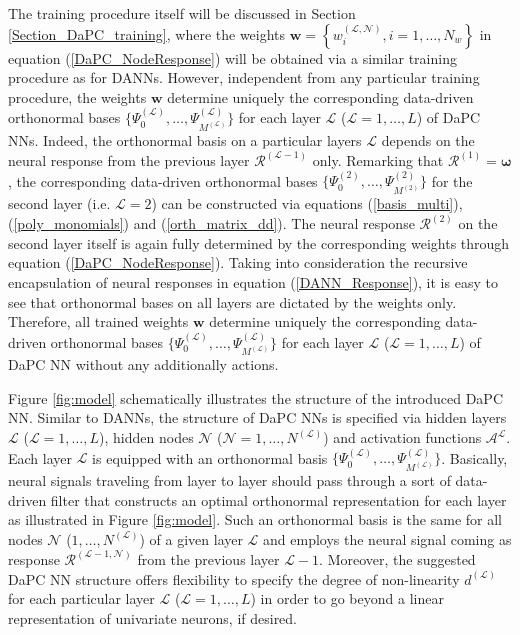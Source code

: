 \documentclass[a4paper,fleqn]{article}
\newcommand{\rw}[1]{\textcolor{blue}{#1}}
\newcommand{\del}[1]{\textcolor{red}{\sout{#1}}}
\renewcommand{\del}[1]{}
\renewcommand{\rw}[1]{#1}
\begin{document}
The training procedure itself will be discussed in Section \ref{Section_DaPC_training}, where the weights $\bm{w}=\left\{w^{(\mathcal{L},\mathcal{N})}_{i},i=1,\ldots,N_w \right\}$ in equation (\ref{DaPC_NodeResponse}) will be obtained via a similar training procedure as for DANNs.  However, independent from any particular training procedure, the weights $\bm{w}$ determine uniquely the corresponding data-driven orthonormal bases $\big\{ \Psi^{(\mathcal{L})}_0,\ldots, \Psi^{(\mathcal{L})}_{M^{(\mathcal{L})}}\big\}$ for each layer $\mathcal{L}$ ($\mathcal{L}=1,\ldots,L$) of DaPC NNs. Indeed, the orthonormal basis on a particular layers $\mathcal{L}$ depends on the neural response from the previous layer $\bm{\mathcal{R}}^{(\mathcal{L}-1)}$ only. Remarking that $\bm{\mathcal{R}}^{(1)} =\bm{\omega}$, the corresponding data-driven orthonormal bases $\big\{ \Psi^{(2)}_0,\ldots, \Psi^{(2)}_{M^{(2)}}\big\}$ for the second layer (i.e. $\mathcal{L}=2$) \del{could} \rw{can} be constructed via equations (\ref{basis_multi}), (\ref{poly_monomials}) and (\ref{orth_matrix_dd}). The neural response  $\bm{\mathcal{R}}^{(2)}$ on the second layer itself is again fully determined by the corresponding weights through equation (\ref{DaPC_NodeResponse}). Taking into consideration the recursive encapsulation of neural responses in equation (\ref{DANN_Response}), it is easy to see that orthonormal bases on all layers are dictated by the weights only. Therefore, all trained weights $\bm{w}$ determine uniquely the corresponding data-driven orthonormal bases $\big\{ \Psi^{(\mathcal{L})}_0,\ldots, \Psi^{(\mathcal{L})}_{M^{(\mathcal{L})}}\big\}$ for each layer $\mathcal{L}$ ($\mathcal{L}=1,\ldots,L$) of DaPC NN without any additionally actions.

Figure \ref{fig:model} schematically illustrates the structure of the introduced DaPC NN.  Similar to DANNs, the structure of DaPC NNs is specified via hidden layers $\mathcal{L}$ ($\mathcal{L}=1,\ldots,L$), hidden nodes $\mathcal{N}$ ($\mathcal{N}=1,\ldots,N^{(\mathcal{L})}$) and activation functions $\mathcal{A}^\mathcal{L}$. 
\del{However, each} \rw{Each} layer $\mathcal{L}$ is equipped with \del{the} \rw{an} orthonormal basis  $\big\{ \Psi^{(\mathcal{L})}_0,\ldots, \Psi^{(\mathcal{L})}_{M^{(\mathcal{L})}}\big\}$.%
Basically, neural signals traveling from layer to layer should pass through a sort of data-driven filter that \del{allocates} \rw{constructs} an optimal orthonormal representation for each layer \del{additively} as illustrated in Figure \ref{fig:model}. Such an orthonormal basis is the same for all nodes $\mathcal{N}$ ($1,\ldots,N^{(\mathcal{L})}$) of a given layer $\mathcal{L}$ and employs the neural signal coming as response $\mathcal{R}^{(\mathcal{L}-1,\mathcal{N})}$ from the previous layer $\mathcal{L}-1$.  Moreover, the suggested DaPC NN structure offers flexibility to specify the degree of non-linearity $d^{(\mathcal{L})}$ for each particular layer $\mathcal{L}$ ($\mathcal{L}=1,\ldots,L$) in order to go beyond a linear representation of \rw{univariate neurons}, if desired.
 
\end{document}
